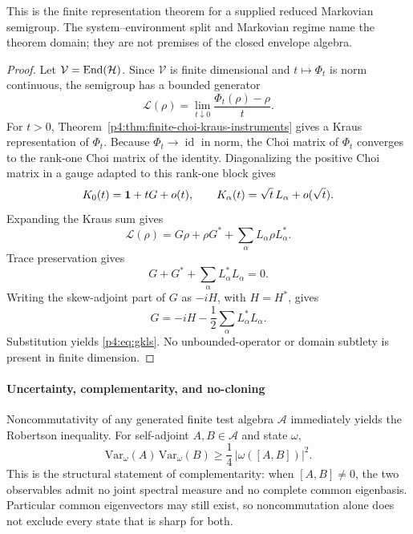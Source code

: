 \documentclass[12pt,a4paper]{article}
\begin{document}
This is the finite representation theorem for a supplied reduced Markovian semigroup.  The system--environment split and Markovian regime name the theorem domain; they are not premises of the closed envelope algebra.

\begin{proof}
Let \(\mathcal V=\operatorname{End}(\mathcal H)\).  Since \(\mathcal V\) is finite dimensional and \(t\mapsto\Phi_t\) is norm continuous, the semigroup has a bounded generator
\[
\mathcal L(\rho)=\lim_{t\downarrow0}\frac{\Phi_t(\rho)-\rho}{t}.
\]
For \(t>0\), Theorem~\ref{p4:thm:finite-choi-kraus-instruments} gives a Kraus representation of \(\Phi_t\).  Because \(\Phi_t\to\operatorname{id}\) in norm, the Choi matrix of \(\Phi_t\) converges to the rank-one Choi matrix of the identity.  Diagonalizing the positive Choi matrix in a gauge adapted to this rank-one block gives
\[
K_0(t)=\mathbf{1}+tG+o(t),
\qquad
K_\alpha(t)=\sqrt t\,L_\alpha+o(\sqrt t).
\]
Expanding the Kraus sum gives
\[
\mathcal L(\rho)=G\rho+\rho G^*+\sum_\alpha L_\alpha\rho L_\alpha^*.
\]
Trace preservation gives
\[
G+G^*+\sum_\alpha L_\alpha^*L_\alpha=0.
\]
Writing the skew-adjoint part of \(G\) as \(-iH\), with \(H=H^*\), gives
\[
G=-iH-\frac12\sum_\alpha L_\alpha^*L_\alpha .
\]
Substitution yields \eqref{p4:eq:gkls}.  No unbounded-operator or domain subtlety is present in finite dimension.
\end{proof}



\paragraph{Uncertainty, complementarity, and no-cloning}
\label{p4:sec:part1-no-go}

Noncommutativity of any generated finite test algebra \(\mathcal A\)
immediately yields the Robertson inequality.  For self-adjoint
\(A,B\in\mathcal A\) and state \(\omega\),
\begin{equation}
\label{p4:eq:uncertainty}
\mathrm{Var}_\omega(A)\,\mathrm{Var}_\omega(B)
\ge
\frac14\,|\omega([A,B])|^2.
\end{equation}
This is the structural statement of complementarity: when
\([A,B]\ne0\), the two observables admit no joint spectral measure and no
complete common eigenbasis.  Particular common eigenvectors may still exist,
so noncommutation alone does not exclude every state that is sharp for both.
\end{document}
